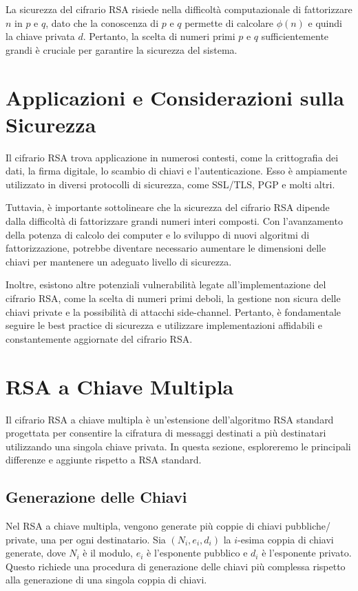 \documentclass[a4paper,12pt]{report}
\begin{document}
La sicurezza del cifrario RSA risiede nella difficoltà computazionale di fattorizzare $n$ in $p$ e $q$, dato che la conoscenza di $p$ e $q$ permette di calcolare $\phi(n)$ e quindi la chiave privata $d$. Pertanto, la scelta di numeri primi $p$ e $q$ sufficientemente grandi è cruciale per garantire la sicurezza del sistema.

\section{Applicazioni e Considerazioni sulla Sicurezza}
Il cifrario RSA trova applicazione in numerosi contesti, come la crittografia dei dati, la firma digitale, lo scambio di chiavi e l'autenticazione. Esso è ampiamente utilizzato in diversi protocolli di sicurezza, come SSL/TLS, PGP e molti altri.

Tuttavia, è importante sottolineare che la sicurezza del cifrario RSA dipende dalla difficoltà di fattorizzare grandi numeri interi composti. Con l'avanzamento della potenza di calcolo dei computer e lo sviluppo di nuovi algoritmi di fattorizzazione, potrebbe diventare necessario aumentare le dimensioni delle chiavi per mantenere un adeguato livello di sicurezza.

Inoltre, esistono altre potenziali vulnerabilità legate all'implementazione del cifrario RSA, come la scelta di numeri primi deboli, la gestione non sicura delle chiavi private e la possibilità di attacchi side-channel. Pertanto, è fondamentale seguire le best practice di sicurezza e utilizzare implementazioni affidabili e constantemente aggiornate del cifrario RSA.

\section{RSA a Chiave Multipla}

Il cifrario RSA a chiave multipla è un'estensione dell'algoritmo RSA standard progettata per consentire la cifratura di messaggi destinati a più destinatari utilizzando una singola chiave privata. In questa sezione, esploreremo le principali differenze e aggiunte rispetto a RSA standard.

\subsection{Generazione delle Chiavi}

Nel RSA a chiave multipla, vengono generate più coppie di chiavi pubbliche/ private, una per ogni destinatario. Sia \( (N_i, e_i, d_i) \) la \( i \)-esima coppia di chiavi generate, dove \( N_i \) è il modulo, \( e_i \) è l'esponente pubblico e \( d_i \) è l'esponente privato. Questo richiede una procedura di generazione delle chiavi più complessa rispetto alla generazione di una singola coppia di chiavi.
\end{document}
